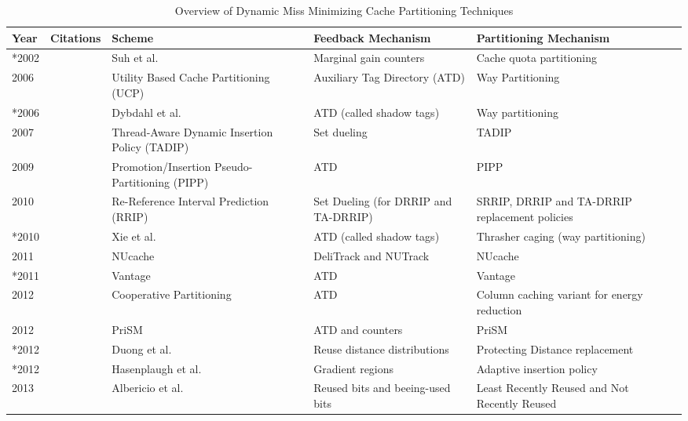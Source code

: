 
\begin{table*}[tp]
    \caption{Overview of Dynamic Miss Minimizing Cache Partitioning Techniques}
    \label{tab:cachePartTaxonomy}
    \begin{tabularx}{\textwidth}{lcXXXX}
    \toprule
    Year & Citations & Scheme & Feedback Mechanism & Partitioning Mechanism \\    
    \midrule
    *2002 & & Suh et al.\ \cite{suh02,dynPartofSharedCacheMemory} & Marginal gain counters & Cache quota partitioning \\    
    2006 & & Utility Based Cache Partitioning (UCP) \cite{utilityBasedCachePartitioning} & Auxiliary Tag Directory (ATD) & Way Partitioning \\ 
    *2006 & & Dybdahl et al.\ \cite{haakonHiPC} & ATD (called shadow tags) & Way partitioning \\
    2007 & & Thread-Aware Dynamic Insertion Policy (TADIP) \cite{jaleel08} & Set dueling \cite{shadowTagInsertionPolicies} & TADIP \\
    2009 & & Promotion/Insertion Pseudo-Partitioning (PIPP) \cite{xie09} & ATD & PIPP \\
    2010 & & Re-Reference Interval Prediction (RRIP) \cite{jaleel10} & Set Dueling (for DRRIP and TA-DRRIP) & SRRIP, DRRIP and TA-DRRIP replacement policies \\
    *2010 & & Xie et al.\ \cite{xie10} & ATD (called shadow tags) & Thrasher caging (way partitioning) \\
    2011 & & NUcache \cite{manikantan11} & DeliTrack and NUTrack & NUcache \\
    *2011 & & Vantage \cite{sanchez11} & ATD & Vantage \\
    2012 & & Cooperative Partitioning \cite{sundararajan12} & ATD & Column caching variant for energy reduction \\ %
    2012 & & PriSM \cite{manikantan12} & ATD and counters & PriSM \\ %
    *2012 & & Duong et al.\ \cite{duong12} & Reuse distance distributions & Protecting Distance replacement \\
    *2012 & & Hasenplaugh et al.\ \cite{hasenplaugh12}  & Gradient regions & Adaptive insertion policy \\ %
    2013 & &  Albericio et al.\ \cite{albericio13}  & Reused bits and beeing-used bits & Least Recently Reused and Not Recently Reused \\ %
    \bottomrule
    \end{tabularx}    
\end{table*}


